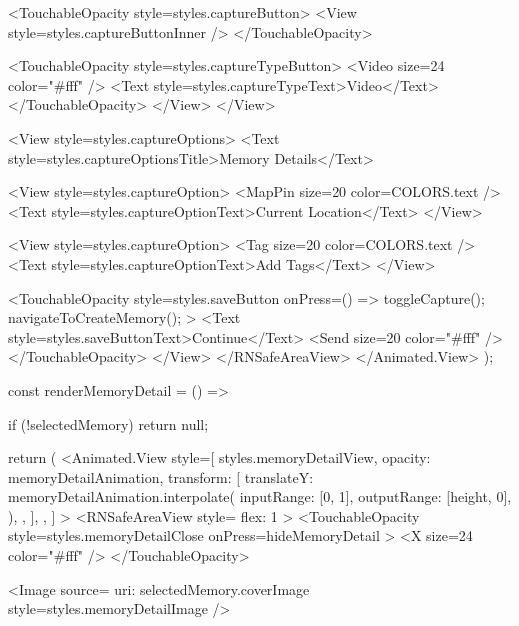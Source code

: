 {            <TouchableOpacity style={styles.captureButton}>
              <View style={styles.captureButtonInner} />
            </TouchableOpacity>
            
            <TouchableOpacity style={styles.captureTypeButton}>
              <Video size={24} color="#fff" />
              <Text style={styles.captureTypeText}>Video</Text>
            </TouchableOpacity>
          </View>
        </View>
        
        <View style={styles.captureOptions}>
          <Text style={styles.captureOptionsTitle}>Memory Details</Text>
          
          <View style={styles.captureOption}>
            <MapPin size={20} color={COLORS.text} />
            <Text style={styles.captureOptionText}>Current Location</Text>
          </View>
          
          <View style={styles.captureOption}>
            <Tag size={20} color={COLORS.text} />
            <Text style={styles.captureOptionText}>Add Tags</Text>
          </View>
          
          <TouchableOpacity 
            style={styles.saveButton}
            onPress={() => {
              toggleCapture();
              navigateToCreateMemory();
            }}
          >
            <Text style={styles.saveButtonText}>Continue</Text>
            <Send size={20} color="#fff" />
          </TouchableOpacity>
        </View>
      </RNSafeAreaView>
    </Animated.View>
  );
  
  const renderMemoryDetail = () => {
    if (!selectedMemory) return null;
    
    return (
      <Animated.View
        style={[
          styles.memoryDetailView,
          {
            opacity: memoryDetailAnimation,
            transform: [
              {
                translateY: memoryDetailAnimation.interpolate({
                  inputRange: [0, 1],
                  outputRange: [height, 0],
                }),
              },
            ],
          },
        ]}
      >
        <RNSafeAreaView style={{ flex: 1 }}>
          <TouchableOpacity
            style={styles.memoryDetailClose}
            onPress={hideMemoryDetail}
          >
            <X size={24} color="#fff" />
          </TouchableOpacity>
          
          <Image
            source={{ uri: selectedMemory.coverImage }}
            style={styles.memoryDetailImage}
          />
          
}}
